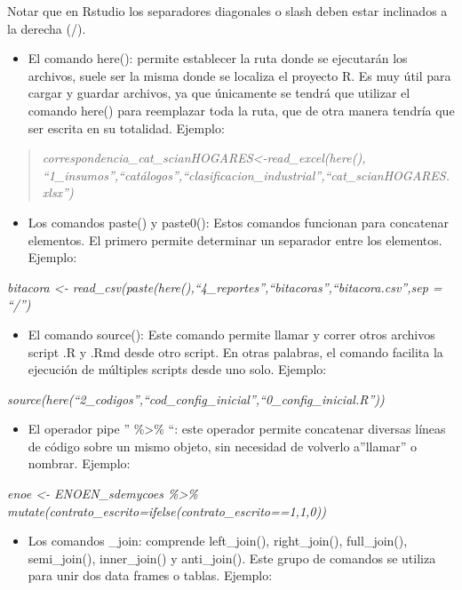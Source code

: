 \documentclass[
]{article}
\providecommand{\tightlist}{%
  \setlength{\itemsep}{0pt}\setlength{\parskip}{0pt}}
\begin{document}
Notar que en Rstudio los separadores diagonales o slash deben estar inclinados a la derecha (/).

\begin{itemize}
\tightlist
\item
  El comando here(): permite establecer la ruta donde se ejecutarán los archivos, suele ser la misma donde se localiza el proyecto R. Es muy útil para cargar y guardar archivos, ya que únicamente se tendrá que utilizar el comando here() para reemplazar toda la ruta, que de otra manera tendría que ser escrita en su totalidad. Ejemplo:
\end{itemize}

\begin{quote}
\emph{correspondencia\_cat\_scianHOGARES\textless-read\_excel(here(), ``1\_insumos'',``catálogos'',``clasificacion\_industrial'',``cat\_scianHOGARES.xlsx'')}
\end{quote}

\begin{itemize}
\tightlist
\item
  Los comandos paste() y paste0(): Estos comandos funcionan para concatenar elementos. El primero permite determinar un separador entre los elementos. Ejemplo:
\end{itemize}

\emph{bitacora \textless- read\_csv(paste(here(),``4\_reportes'',``bitacoras'',``bitacora.csv'',sep = ``/'')}

\begin{itemize}
\tightlist
\item
  El comando source(): Este comando permite llamar y correr otros archivos script .R y .Rmd desde otro script. En otras palabras, el comando facilita la ejecución de múltiples scripts desde uno solo. Ejemplo:
\end{itemize}

\emph{source(here(``2\_codigos'',``cod\_config\_inicial'',``0\_config\_inicial.R''))}

\begin{itemize}
\tightlist
\item
  El operador pipe '' \%\textgreater\% ``: este operador permite concatenar diversas líneas de código sobre un mismo objeto, sin necesidad de volverlo a''llamar'' o nombrar. Ejemplo:
\end{itemize}

\emph{enoe \textless- ENOEN\_sdemycoes \%\textgreater\% mutate(contrato\_escrito=ifelse(contrato\_escrito==1,1,0))}

\begin{itemize}
\tightlist
\item
  Los comandos \_join: comprende left\_join(), right\_join(), full\_join(), semi\_join(), inner\_join() y anti\_join(). Este grupo de comandos se utiliza para unir dos data frames o tablas. Ejemplo:
\end{itemize}
\end{document}
